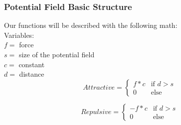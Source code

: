 		\subsubsection{Potential Field Basic Structure}
		Our functions will be described with the following math\cite{ptlp}: \\
		
		Variables:\\
		$f =$ force\\
		$s =$ size of the potential field\\
		$c =$ constant\\
		$d =$ distance\\
		
		\begin{displaymath}
			Attractive = \begin{cases}
					f * c & \text{if $d > s$}\\
					0 & \text{else}
				\end{cases}		
		\end{displaymath}
			
		\begin{displaymath}
			Repulsive = \begin{cases}
					- f * c & \text{if $d > s$}\\
					0 & \text{else}
				\end{cases}		
		\end{displaymath}
		
		
